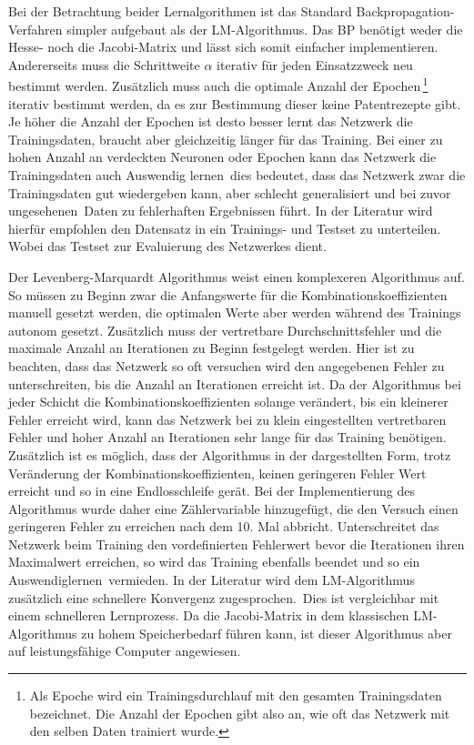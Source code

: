 Bei der Betrachtung beider Lernalgorithmen ist das Standard Backpropagation-Verfahren simpler aufgebaut als der LM-Algorithmus. Das BP benötigt weder die Hesse- noch die Jacobi-Matrix und lässt sich somit einfacher implementieren. Andererseits muss die Schrittweite $\alpha$ iterativ für jeden Einsatzzweck neu bestimmt werden. Zusätzlich muss auch die optimale Anzahl der Epochen\,\footnote{Als Epoche wird ein Trainingsdurchlauf mit den gesamten Trainingsdaten bezeichnet. Die Anzahl der Epochen gibt also an, wie oft das Netzwerk mit den selben Daten trainiert wurde.%
} iterativ bestimmt werden, da es zur Bestimmung dieser keine Patentrezepte gibt. Je höher die Anzahl der Epochen ist desto besser lernt das Netzwerk die Trainingsdaten, braucht aber gleichzeitig länger für das Training. Bei einer zu hohen Anzahl an verdeckten Neuronen oder Epochen kann das Netzwerk die Trainingsdaten auch \glqq Auswendig lernen\grqq~dies bedeutet, dass das Netzwerk zwar die Trainingsdaten gut wiedergeben kann, aber schlecht generalisiert und bei zuvor \glqq ungesehenen\grqq~Daten zu fehlerhaften Ergebnissen führt. In der Literatur wird hierfür empfohlen den Datensatz in ein Trainings- und Testset zu unterteilen. Wobei das Testset zur Evaluierung des Netzwerkes dient.\,

Der Levenberg-Marquardt Algorithmus weist einen komplexeren Algorithmus auf. So müssen zu Beginn zwar die Anfangswerte für die Kombinationskoeffizienten manuell gesetzt werden, die optimalen Werte aber werden während des Trainings autonom gesetzt. Zusätzlich muss der vertretbare Durchschnittsfehler und die maximale Anzahl an Iterationen zu Beginn festgelegt werden. Hier ist zu beachten, dass das Netzwerk so oft versuchen wird den angegebenen Fehler zu unterschreiten, bis die Anzahl an Iterationen erreicht ist. Da der Algorithmus bei jeder Schicht die Kombinationskoeffizienten solange verändert, bis ein kleinerer Fehler erreicht wird, kann das Netzwerk bei zu klein eingestellten vertretbaren Fehler und hoher Anzahl an Iterationen sehr lange für das Training benötigen. Zusätzlich ist es möglich, dass der Algorithmus in der dargestellten Form, trotz Veränderung der Kombinationskoeffizienten, keinen geringeren Fehler Wert erreicht und so in eine Endlosschleife gerät. Bei der Implementierung des Algorithmus wurde daher eine Zählervariable hinzugefügt, die den Versuch einen geringeren Fehler zu erreichen nach dem 10. Mal abbricht. Unterschreitet das Netzwerk beim Training den vordefinierten Fehlerwert bevor die Iterationen ihren Maximalwert erreichen, so wird das Training ebenfalls beendet und so ein \glqq Auswendiglernen\grqq~vermieden. In der Literatur wird dem LM-Algorithmus zusätzlich eine schnellere Konvergenz zugesprochen.\, Dies ist vergleichbar mit einem schnelleren Lernprozess. Da die Jacobi-Matrix in dem klassischen LM-Algorithmus zu hohem Speicherbedarf führen kann, ist dieser Algorithmus aber auf leistungsfähige Computer angewiesen. 

